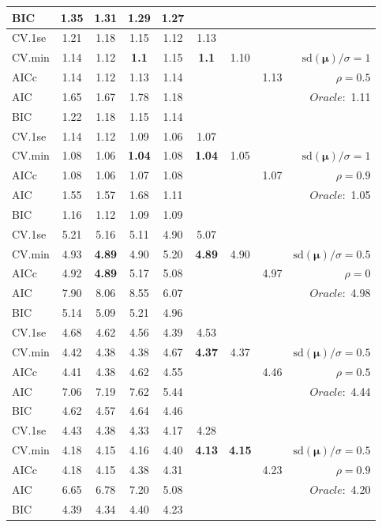 \begin{table}
\begin{center}
\begin{tabular}{l*{7}{c}|r}
BIC & 1.35 & 1.31 & 1.29 & 1.27 & & & &  \\
 \hline 
CV.1se & 1.21 & 1.18 & 1.15 & 1.12 & 1.13 & & & \\
CV.min & 1.14 & 1.12 & {\bf 1.1} & 1.15 & {\bf 1.1} & 1.10 & & $\mathrm{sd}(\mathbf{\mu})/\sigma=1$ \\
AICc & 1.14 & 1.12 & 1.13 & 1.14 & & & 1.13 &  $\rho=0.5$ \\
AIC & 1.65 & 1.67 & 1.78 & 1.18 & & & &  \multirow{2}{*}{$Oracle: $ 1.11} \\
BIC & 1.22 & 1.18 & 1.15 & 1.14 & & & &  \\
 \hline 
CV.1se & 1.14 & 1.12 & 1.09 & 1.06 & 1.07 & & & \\
CV.min & 1.08 & 1.06 & {\bf 1.04} & 1.08 & {\bf 1.04} & 1.05 & & $\mathrm{sd}(\mathbf{\mu})/\sigma=1$ \\
AICc & 1.08 & 1.06 & 1.07 & 1.08 & & & 1.07 &  $\rho=0.9$ \\
AIC & 1.55 & 1.57 & 1.68 & 1.11 & & & &  \multirow{2}{*}{$Oracle: $ 1.05} \\
BIC & 1.16 & 1.12 & 1.09 & 1.09 & & & &  \\
 \hline 
CV.1se & 5.21 & 5.16 & 5.11 & 4.90 & 5.07 & & & \\
CV.min & 4.93 & {\bf 4.89} & 4.90 & 5.20 & {\bf 4.89} & 4.90 & & $\mathrm{sd}(\mathbf{\mu})/\sigma=0.5$ \\
AICc & 4.92 & {\bf 4.89} & 5.17 & 5.08 & & & 4.97 &  $\rho=0$ \\
AIC & 7.90 & 8.06 & 8.55 & 6.07 & & & &  \multirow{2}{*}{$Oracle: $ 4.98} \\
BIC & 5.14 & 5.09 & 5.21 & 4.96 & & & &  \\
 \hline 
CV.1se & 4.68 & 4.62 & 4.56 & 4.39 & 4.53 & & & \\
CV.min & 4.42 & 4.38 & 4.38 & 4.67 & {\bf 4.37} & 4.37 & & $\mathrm{sd}(\mathbf{\mu})/\sigma=0.5$ \\
AICc & 4.41 & 4.38 & 4.62 & 4.55 & & & 4.46 &  $\rho=0.5$ \\
AIC & 7.06 & 7.19 & 7.62 & 5.44 & & & &  \multirow{2}{*}{$Oracle: $ 4.44} \\
BIC & 4.62 & 4.57 & 4.64 & 4.46 & & & &  \\
 \hline 
CV.1se & 4.43 & 4.38 & 4.33 & 4.17 & 4.28 & & & \\
CV.min & 4.18 & 4.15 & 4.16 & 4.40 & {\bf 4.13} & {\bf 4.15} & & $\mathrm{sd}(\mathbf{\mu})/\sigma=0.5$ \\
AICc & 4.18 & 4.15 & 4.38 & 4.31 & & & 4.23 &  $\rho=0.9$ \\
AIC & 6.65 & 6.78 & 7.20 & 5.08 & & & &  \multirow{2}{*}{$Oracle: $ 4.20} \\
BIC & 4.39 & 4.34 & 4.40 & 4.23 & & & &  \\
 \hline 
\end{tabular}
\end{center}
\vspace{-1cm}
\end{table}





